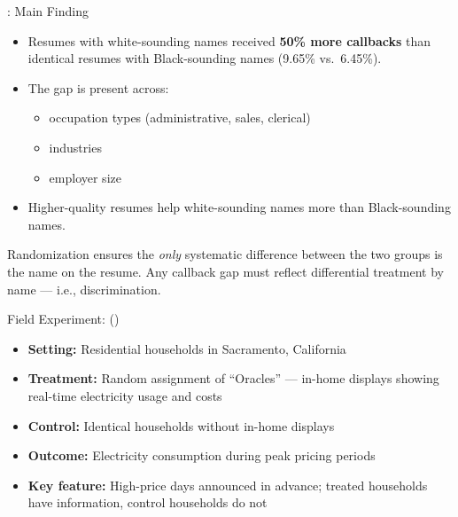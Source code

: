 \documentclass[aspectratio=169, 11pt]{beamer}
\begin{document}
\begin{frame}[t]{\citeauthor{Bertrand2004_emily}: Main Finding}
\begin{itemize}
  \setlength\itemsep{0.5em}
  \item Resumes with white-sounding names received \textbf{50\% more callbacks}
        than identical resumes with Black-sounding names
        (9.65\% vs.\ 6.45\%).
  \item The gap is present across:
    \begin{itemize}
      \item occupation types (administrative, sales, clerical)
      \item industries
      \item employer size
    \end{itemize}
  \item Higher-quality resumes help white-sounding names more than
        Black-sounding names.
\end{itemize}
\vspace{0.3em}
\begin{keybox}
Randomization ensures the \emph{only} systematic difference between the two groups
is the name on the resume. Any callback gap must reflect differential treatment
by name — i.e., discrimination.
\end{keybox}
\end{frame}

\begin{frame}[t]{Field Experiment: \citeauthor{Jessoe2014_energy} (\citeyear{Jessoe2014_energy})}
\begin{examplebox}
  \small
  \begin{itemize}
    \item \textbf{Setting:} Residential households in Sacramento, California
    \item \textbf{Treatment:} Random assignment of ``Oracles'' — in-home displays
          showing real-time electricity usage and costs
    \item \textbf{Control:} Identical households without in-home displays
    \item \textbf{Outcome:} Electricity consumption during peak pricing periods
    \item \textbf{Key feature:} High-price days announced in advance;
          treated households have information, control households do not
  \end{itemize}
\end{examplebox}
\end{frame}
\end{document}
